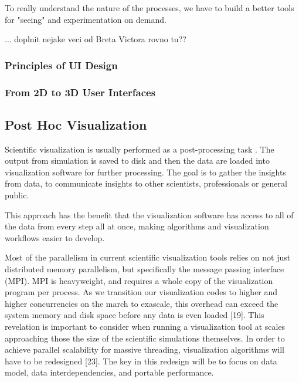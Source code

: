 
To really understand the nature of the processes, we have to build a better tools for "seeing" and experimentation on demand. 

... doplnit nejake veci od Breta Victora rovno tu??

\subsubsection{Principles of UI Design}

\subsubsection{From 2D to 3D User Interfaces}



\subsection{Post Hoc Visualization}

Scientific visualization is usually performed as a post-processing task \citep{kressSituVisualizationTechniques}. The output from simulation is saved to disk and then the data are loaded into visualization software for further processing. The goal is to gather the insights from data, 
to communicate insights to other scientists, professionals or general public. 

This approach has the benefit that the visualization software has access to all of the data from every step all at once, making algorithms and visualization workflows easier to develop.

Most of the parallelism in current scientific visualization tools relies on not just distributed memory parallelism, but specifically the message passing interface (MPI). MPI is heavyweight, and requires a whole copy of the visualization program per process. As we transition our visualization codes to higher and higher concurrencies on the march to exascale, this overhead can exceed the system memory and disk space before any data is even loaded [19]. This revelation is important to consider when running a visualization tool at scales approaching those the size of the scientific simulations themselves.
In order to achieve parallel scalability for massive threading, visualization algorithms will have to be redesigned [23]. The key in this redesign will be to focus on data model, data interdependencies, and portable performance.

